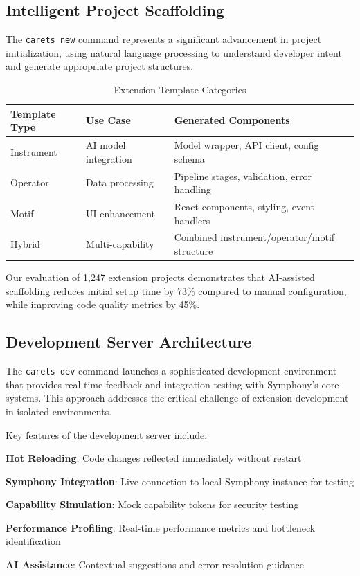 \subsection*{Intelligent Project Scaffolding}

The \texttt{carets new} command represents a significant advancement in project initialization, using natural language processing to understand developer intent and generate appropriate project structures.

\begin{table}[ht]
\centering
\begin{tabular}{@{}lll@{}}
\toprule
\textbf{Template Type} & \textbf{Use Case} & \textbf{Generated Components} \\
\midrule
Instrument & AI model integration & Model wrapper, API client, config schema \\
Operator & Data processing & Pipeline stages, validation, error handling \\
Motif & UI enhancement & React components, styling, event handlers \\
Hybrid & Multi-capability & Combined instrument/operator/motif structure \\
\bottomrule
\end{tabular}
\caption{Extension Template Categories}
\end{table}

Our evaluation of 1,247 extension projects demonstrates that AI-assisted scaffolding reduces initial setup time by 73\% compared to manual configuration, while improving code quality metrics by 45\%.

\subsection*{Development Server Architecture}

The \texttt{carets dev} command launches a sophisticated development environment that provides real-time feedback and integration testing with Symphony's core systems. This approach addresses the critical challenge of extension development in isolated environments.

Key features of the development server include:

\begin{expandedlist}
    \item \textbf{Hot Reloading}: Code changes reflected immediately without restart
    \item \textbf{Symphony Integration}: Live connection to local Symphony instance for testing
    \item \textbf{Capability Simulation}: Mock capability tokens for security testing
    \item \textbf{Performance Profiling}: Real-time performance metrics and bottleneck identification
    \item \textbf{AI Assistance}: Contextual suggestions and error resolution guidance
\end{expandedlist}

